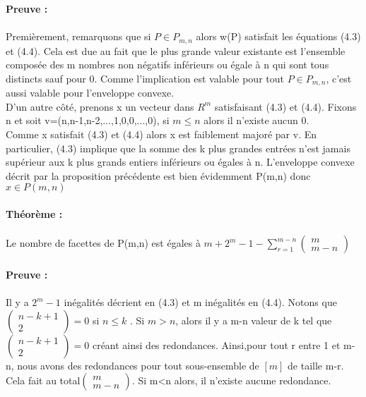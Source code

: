 \documentclass{book}
\begin{document}
\textbf{Preuve :} \\\\
Premièrement, remarquons que si $P \in P_{m,n}$ alors w(P) satisfait les équations (4.3) et (4.4). Cela est due au fait que le plus grande valeur existante est l'ensemble composée des m nombres non négatifs inférieurs ou égale à n qui sont tous distincts sauf pour 0. Comme l'implication est valable  pour tout $P \in P_{m,n}$, c'est aussi valable pour l'enveloppe convexe. \\
D'un autre côté, prenons x un vecteur dans $R^m$ satisfaisant (4.3) et (4.4). Fixons n et soit v=(n,n-1,n-2,...,1,0,0,...,0), si $ m \leqslant n $ alors il n'existe aucun 0.\\
Comme x satisfait (4.3) et (4.4) alors x est faiblement majoré par v. En particulier, (4.3) implique que la somme des k plus grandes entrées n'est jamais supérieur aux k plus grands entiers inférieurs ou égales à n. L'enveloppe convexe décrit par la proposition précédente est bien évidemment P(m,n) donc $x \in P(m,n)$\\\\
\textbf{Théorème :} \\\\
Le nombre de facettes de P(m,n) est égales à $m + 2^m - 1 - \sum_{r=1}^{m-n} \begin{pmatrix}
m\\m-n
\end{pmatrix}$\\\\
\textbf{Preuve :} \\\\
Il y a $2^m-1$ inégalités décrient en (4.3) et m inégalités en (4.4). Notons que $\begin{pmatrix}
n-k+1\\2
\end{pmatrix}=0$ si $n \leqslant k$ . Si $m>n$, alors il y a m-n valeur de k tel que $\begin{pmatrix}
n-k+1\\2
\end{pmatrix}=0$ créant ainsi des redondances. Ainsi,pour tout r entre 1 et m-n, nous avons des redondances pour tout sous-ensemble de $[m]$ de taille m-r. Cela fait au total$\begin{pmatrix}
m\\m-n
\end{pmatrix}$. Si m<n alors, il n'existe aucune redondance.
\end{document}
